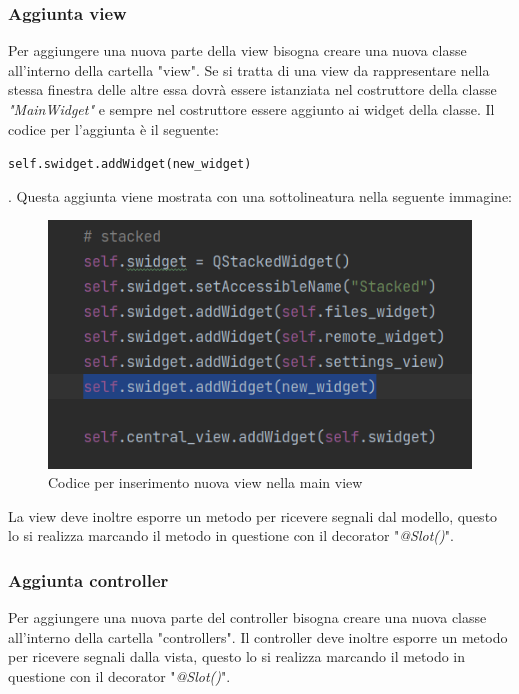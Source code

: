 \subsubsection{Aggiunta view}
Per aggiungere una nuova parte della view bisogna creare una nuova classe all'interno della cartella "view". Se si tratta di una view da rappresentare nella stessa finestra delle altre essa dovrà essere istanziata nel costruttore della classe \textit{"MainWidget"} e sempre nel costruttore essere aggiunto ai widget della classe. Il codice per l'aggiunta è il seguente: \newline{} \centerline{ \texttt{self.swidget.addWidget(new\_widget)}}.
Questa aggiunta viene mostrata con una sottolineatura nella seguente immagine:
\begin{figure}[H]
    \centering
    \includegraphics[scale = 0.75]{components/img/codice-nuova-view-su-main-view.png}
    \caption{Codice per inserimento nuova view nella main view}
    \label{fig:Codice per inserimento nuova view nella main view}
\end{figure}
La view deve inoltre esporre un metodo per ricevere segnali dal modello, questo lo si realizza marcando il metodo in questione con il decorator "\textit{@Slot()}".
\subsubsection{Aggiunta controller}
Per aggiungere una nuova parte del controller bisogna creare una nuova classe all'interno della cartella "controllers". Il controller deve inoltre esporre un metodo per ricevere segnali dalla vista, questo lo si realizza marcando il metodo in questione con il decorator "\textit{@Slot()}".

